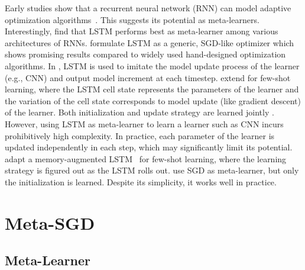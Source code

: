 \documentclass{article}
\begin{document}
Early studies show that a recurrent neural network (RNN) can model adaptive optimization algorithms~\cite{cotter1990fixed,younger1999fixed}. This suggests its potential as meta-learners. Interestingly, \cite{hochreiter2001learning} find that LSTM performs best as meta-learner among various architectures of RNNs. \cite{andrychowicz2016learning} formulate LSTM as a generic, SGD-like optimizer which shows promising results compared to widely used hand-designed optimization algorithms. In \cite{andrychowicz2016learning}, LSTM is used to imitate the model update process of the learner (e.g., CNN) and output model increment at each timestep.  \cite{ravi2017optimization} extend \cite{andrychowicz2016learning} for few-shot learning, where the
LSTM cell state represents the parameters of the learner and the variation of the cell state corresponds to model update (like gradient descent) of the learner. Both initialization and update strategy are learned jointly \cite{ravi2017optimization}. However, using LSTM as meta-learner to learn a learner such as CNN incurs prohibitively high complexity. In practice, each parameter of the learner is updated independently in each step, which may significantly limit its potential. \cite{santoro2016meta} adapt a memory-augmented LSTM~\cite{graves2014neural} for few-shot learning, where the learning strategy is figured out as the LSTM rolls out. \cite{finn2017model} use SGD as meta-learner, but only the initialization is learned. Despite its simplicity, it works well in practice.






















 
\section{Meta-SGD}






\subsection{Meta-Learner}
\end{document}
